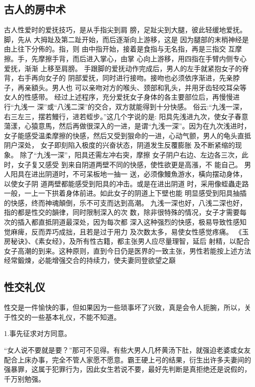 \documentclass[12pt,UTF8]{ctexbook}
\begin{document}
\subsection{古人的房中术}

古人性爱时的爱抚技巧，是从手指尖到肩
膀，足趾尖到大腿，彼此轻缓地爱抚。脚，先从
大拇趾及第二趾开始，而后逐渐向上游移，这是
因为腿部的末梢神经是由上往下分佈的。指，则
由中指开始，接着是食指与无名指，再是三指交
互摩擦。手，先摩擦手背，而后进入掌心，由掌
心向上游移，用四指在手臂内侧专心爱抚，渐渐
上移至肩膀。
手跟脚的爱抚动作完成后，男人的左手就紧抱女子的脊背，右手再向女子的
阴部爱抚，同时进行接吻。接吻也必须依序渐进，先亲脖子，再亲額头。男人也
可以亲吻对方的喉头、颈部和乳头，并用牙齿轻咬耳朵等女人的性感带。
经过上述程序，充分爱抚女子身体的各主要部位后，再慢慢进行“九浅一
深”或“八浅二深”的交合，双方就能得到十分快感。
俗云:“九浅一深，右三左三，摆若鰻行，进若蛭步。”这几个字说的是:
阳具先浅进九次，使女子春意蕩漾，心猿意馬，然后再做很深入的一进，是谓“九浅一深”。因为在九次浅进时，女子能感受温柔摩擦的快感，然后又受到狠命的一进，心动气颤，男人的龟头直抵阴户深处，
女子即刻陷入极度的兴奋状态，阴道发生反覆膨胀
及不断紧缩的现象。
除了“九浅一深”，阳具还需左冲右突，摩擦
女子阴户右边、左边各三次，此时，女子复又感受
到来自阴道两壁不同的快感，使性欲更是高漲，不
能自己。
男人阳具在进出阴道时，不可呆板地一抽一
送，必须像鰻魚游水，橫向摆动身体，以使女子阴
道两壁都能感受到阳具的冲击。或是在进出阴道
时，采用像蛭蟲走路一般，一上一下拱着身体前进。如此女子的阴道上下壁也能
明显感受到阳具抽插的快感，终而神魂顛倒，乐不可支而达到高潮。
九浅一深也好，八浅二深也好，指的都是性交的韻律，同时限制深入的次
数，除非很特殊的情况，女子才需要每次的插入都直抵阴道最深处，因为每次都
深入这种强烈的快感，极易导致性感知觉麻痺，反而弄巧成拙，且若是过于用力
及次数太多，易使女性感觉疼痛。
《玉房秘诀》、《素女经》，及所有性古籍，都主张男人应尽量理智，延后
射精，以配合女子高潮的到来。这种原则，直到今日仍是医界的一致主张，男性若能按上述方法经常鍛煉，必能增强交合的持续力，使夫妻同登欲望之巔

\subsection{性交礼仪}

性交是一件愉快的事，但如果因为一些琐事坏了兴致，真是会令人扼腕，所以，关于性交的一些基本礼仪，不能不知道。

1.事先征求对方同意。

“女人说不要就是要？”那可不见得。有些大男人几杯黄汤下肚，就强迫老婆或女友配合上床办事，完全不管人家愿不愿意。霸王硬上弓的结果，衍生出许多夫妻间的强暴罪，这属于犯罪行为，因此女生若说不要，最好先判断是真拒绝还是说假的，千万别勉强。
\end{document}
